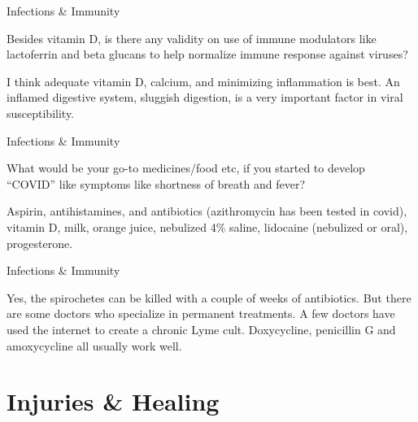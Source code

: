 \documentclass[11pt,oneside,openany,extrafontsizes]{memoir}
\begin{document}
\begin{qaexchange}{Infections \& Immunity}

    \begin{question}
         Besides vitamin D, is there any validity on use of immune modulators like lactoferrin and beta glucans to help normalize immune response against viruses?
    \end{question}

    \begin{answer}
      I think adequate vitamin D, calcium, and minimizing inflammation is best. An inflamed digestive system, sluggish digestion, is a very important factor in viral susceptibility.
    \end{answer}
\end{qaexchange}

\begin{qaexchange}{Infections \& Immunity}

    \begin{question}
        What would be your go-to medicines/food etc, if you started to develop \enquote{COVID} like symptoms like shortness of breath and fever?
    \end{question}

    \begin{answer}
      Aspirin, antihistamines, and antibiotics (azithromycin has been tested in covid), vitamin D, milk, orange juice, nebulized 4\% saline, lidocaine (nebulized or oral), progesterone.
    \end{answer}
\end{qaexchange}

\begin{standalonequote}{Infections \& Immunity}

    \begin{answer}
      Yes, the spirochetes can be killed with a couple of weeks of antibiotics. But there are some doctors who specialize in permanent treatments. A few doctors have used the internet to create a chronic Lyme cult. Doxycycline, penicillin G and amoxycycline all usually work well.
    \end{answer}
\end{standalonequote}

\section{Injuries \& Healing}
\end{document}
